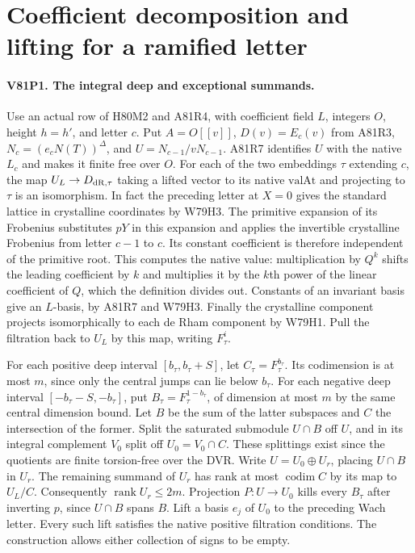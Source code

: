 \section{Coefficient decomposition and lifting for a ramified letter}

\paragraph{V81P1. The integral deep and exceptional summands.}
Use an actual row of H80M2 and A81R4, with coefficient field $L$,
integers $O$, height $h=h'$, and letter $c$. Put $A=O[[v]]$,
$D(v)=E_c(v)$ from A81R3, $N_c=(e_cN(T))^\Delta$, and
$U=N_{c-1}/vN_{c-1}$. A81R7 identifies $U$ with the native
$L_c$ and makes it finite free over $O$. For each of the two
embeddings $\tau$ extending $c$, the map $U_L\to D_{\rm dR,\tau}$
taking a lifted vector to its native $\mathrm{valAt}$ and projecting
to $\tau$ is an isomorphism. In fact the preceding letter at
$X=0$ gives the standard lattice in crystalline coordinates by
W79H3. The primitive expansion of its Frobenius substitutes $pY$
in this expansion and applies the invertible crystalline Frobenius
from letter $c-1$ to $c$. Its constant coefficient is therefore
independent of the primitive root. This computes the native value:
multiplication by $Q^k$ shifts the leading coefficient by $k$ and
multiplies it by the $k$th power of the linear coefficient of $Q$,
which the definition divides out. Constants of an invariant
basis give an $L$-basis, by A81R7 and W79H3. Finally the crystalline
component projects isomorphically to each de Rham component by W79H1.
Pull the filtration back to $U_L$ by this map, writing $F_\tau^i$.

For each positive deep interval $[b_\tau,b_\tau+S]$, let
$C_\tau=F_\tau^{b_\tau}$. Its codimension is at most $m$, since
only the central jumps can lie below $b_\tau$. For each negative
deep interval $[-b_\tau-S,-b_\tau]$, put
$B_\tau=F_\tau^{1-b_\tau}$, of dimension at most $m$ by the
same central dimension bound. Let $B$ be the sum of the latter
subspaces and $C$ the intersection of the former. Split the
saturated submodule $U\cap B$ off $U$, and in its integral
complement $V_0$ split off $U_0=V_0\cap C$. These splittings
exist since the quotients are finite torsion-free over the DVR.
Write $U=U_0\oplus U_r$, placing $U\cap B$ in $U_r$.
The remaining summand of $U_r$ has rank at most
$\operatorname{codim} C$ by its map to $U_L/C$. Consequently
$\operatorname{rank} U_r\le2m$. Projection $P:U\to U_0$
kills every $B_\tau$ after inverting $p$, since $U\cap B$ spans
$B$. Lift a basis $e_j$ of $U_0$ to the preceding Wach letter.
Every such lift satisfies the native positive filtration conditions.
The construction allows either collection of signs to be empty.


